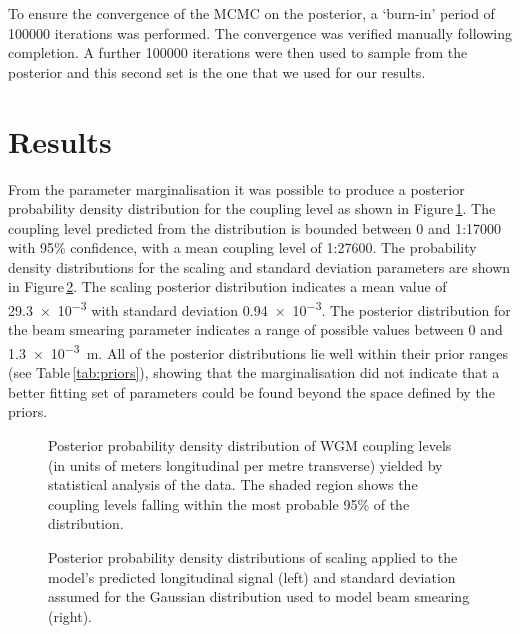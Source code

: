 To ensure the convergence of the MCMC on the posterior, a `burn-in' period of \num{100000} iterations was performed. The convergence was verified manually following completion. A further \num{100000} iterations were then used to sample from the posterior and this second set is the one that we used for our results.

\section{Results}
\label{sec:summary}
From the parameter marginalisation it was possible to produce a posterior probability density distribution for the coupling level as shown in Figure\,\ref{fig:wgm-coupling-prob}. The coupling level predicted from the distribution is bounded between 0 and 1:17000 with 95\% confidence, with a mean coupling level of 1:27600. The probability density distributions for the scaling and standard deviation parameters are shown in Figure\,\ref{fig:posterior-aux}. The scaling posterior distribution indicates a mean value of \num{29.3e-3} with standard deviation \num{0.94e-3}. The posterior distribution for the beam smearing parameter indicates a range of possible values between \num{0} and \SI{1.3e-3}{\meter}. All of the posterior distributions lie well within their prior ranges (see Table\,\ref{tab:priors}), showing that the marginalisation did not indicate that a better fitting set of parameters could be found beyond the space defined by the priors.

\begin{figure}
  \centering
  
  \caption[Posterior probability density distribution of the waveguide mirror coupling levels]{\label{fig:wgm-coupling-prob}Posterior probability density distribution of \gls{WGM} coupling levels (in units of meters longitudinal per metre transverse) yielded by statistical analysis of the data. The shaded region shows the coupling levels falling within the most probable 95\% of the distribution.}
\end{figure}

\begin{figure}
  \centering
  
  \caption[Posterior probability density distributions of scaling and spot position standard deviation factors applied to the waveguide model]{\label{fig:posterior-aux}Posterior probability density distributions of scaling applied to the model's predicted longitudinal signal (left) and standard deviation assumed for the Gaussian distribution used to model beam smearing (right).}
\end{figure}

